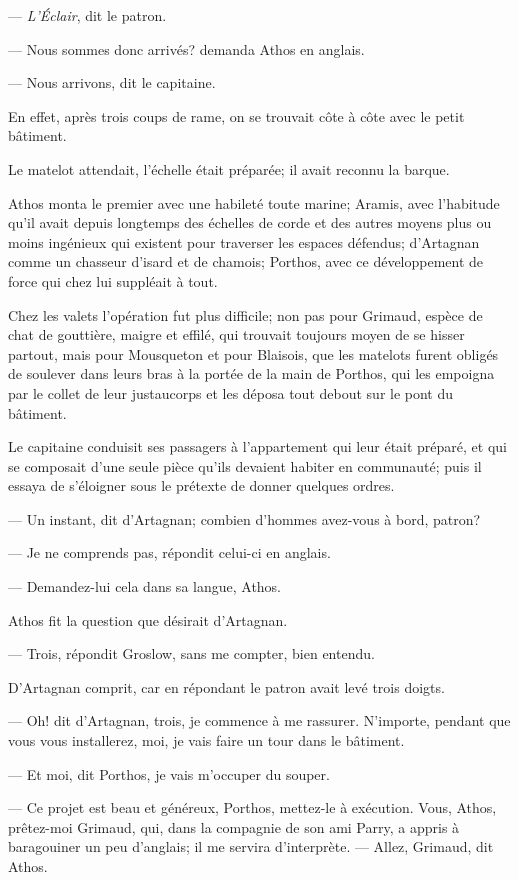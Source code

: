 — \textit{L'Éclair}, dit le patron.

— Nous sommes donc arrivés? demanda Athos en anglais.

— Nous arrivons, dit le capitaine.

En effet, après trois coups de rame, on se trouvait côte à côte avec le petit bâtiment.

Le matelot attendait, l'échelle était préparée; il avait reconnu la barque.

Athos monta le premier avec une habileté toute marine; Aramis, avec l'habitude qu'il avait depuis longtemps des échelles de corde et des autres moyens plus ou moins ingénieux qui existent pour traverser les espaces défendus; d'Artagnan comme un chasseur d'isard et de chamois; Porthos, avec ce développement de force qui chez lui suppléait à tout.

Chez les valets l'opération fut plus difficile; non pas pour Grimaud, espèce de chat de gouttière, maigre et effilé, qui trouvait toujours moyen de se hisser partout, mais pour Mousqueton et pour Blaisois, que les matelots furent obligés de soulever dans leurs bras à la portée de la main de Porthos, qui les empoigna par le collet de leur justaucorps et les déposa tout debout sur le pont du bâtiment.

Le capitaine conduisit ses passagers à l'appartement qui leur était préparé, et qui se composait d'une seule pièce qu'ils devaient habiter en communauté; puis il essaya de s'éloigner sous le prétexte de donner quelques ordres.

— Un instant, dit d'Artagnan; combien d'hommes avez-vous à bord, patron?

— Je ne comprends pas, répondit celui-ci en anglais.

— Demandez-lui cela dans sa langue, Athos.

Athos fit la question que désirait d'Artagnan.

— Trois, répondit Groslow, sans me compter, bien entendu.

D'Artagnan comprit, car en répondant le patron avait levé trois doigts.

— Oh! dit d'Artagnan, trois, je commence à me rassurer. N'importe, pendant que vous vous installerez, moi, je vais faire un tour dans le bâtiment.

— Et moi, dit Porthos, je vais m'occuper du souper.

— Ce projet est beau et généreux, Porthos, mettez-le à exécution. Vous, Athos, prêtez-moi Grimaud, qui, dans la compagnie de son ami
Parry, a appris à baragouiner un peu d'anglais; il me servira d'interprète.
— Allez, Grimaud, dit Athos.

